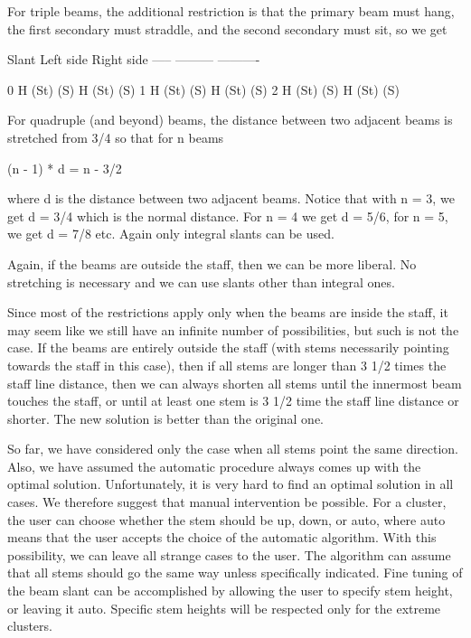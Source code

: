 For triple beams, the additional restriction is that the primary beam
must hang, the first secondary must straddle, and the second secondary
must sit, so we get 

      Slant         Left side        Right side
      -----         ---------       ----------
        
        0               H  (St) (S)     H  (St) (S)
        1               H  (St) (S)     H  (St) (S)
        2               H  (St) (S)     H  (St) (S)


For quadruple (and beyond) beams, the distance between two adjacent
beams is stretched from 3/4 so that for n beams 

        (n - 1) * d = n - 3/2

where d is the distance between two adjacent beams.  Notice that with n
= 3, we get d = 3/4 which is the normal distance.  For n = 4 we get d =
5/6, for n = 5, we get d = 7/8 etc.  Again only integral slants can be
used.

Again, if the beams are outside the staff, then we can be more liberal. 
No stretching is necessary and we can use slants other than integral
ones. 


Since most of the restrictions apply only when the beams are inside the
staff, it may seem like we still have an infinite number of
possibilities, but such is not the case.  If the beams are entirely
outside the staff (with stems necessarily pointing towards the staff in
this case), then if all stems are longer than 3 1/2 times the staff line
distance, then we can always shorten all stems until the innermost beam
touches the staff, or until at least one stem is 3 1/2 time the staff
line distance or shorter.  The new solution is better than the original
one. 

So far, we have considered only the case when all stems point the same
direction.  Also, we have assumed the automatic procedure always comes
up with the optimal solution.  Unfortunately, it is very hard to find an
optimal solution in all cases.  We therefore suggest that manual
intervention be possible.  For a cluster, the user can choose whether the
stem should be up, down, or auto, where auto means that the user accepts
the choice of the automatic algorithm.  With this possibility, we can
leave all strange cases to the user.  The algorithm can assume that all
stems should go the same way unless specifically indicated.  Fine tuning
of the beam slant can be accomplished by allowing the user to specify
stem height, or leaving it auto.  Specific stem heights will be
respected only for the extreme clusters.
